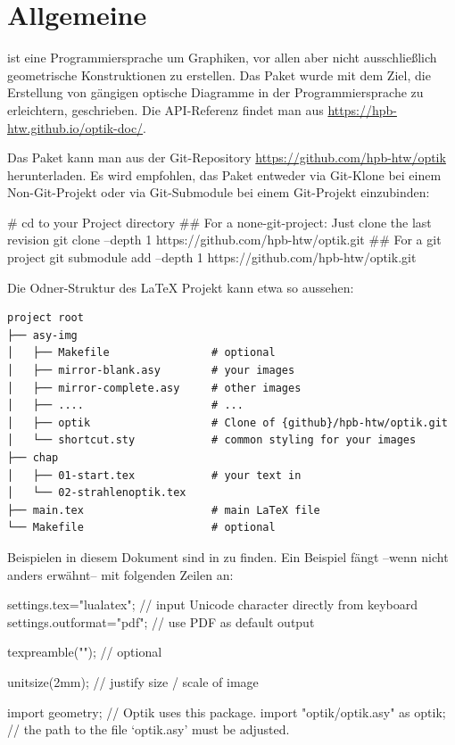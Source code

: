 \chapter{Allgemeine}

\asypmtote\cite{Asymptote} ist eine Programmiersprache um Graphiken, vor allen aber nicht ausschließlich geometrische Konstruktionen zu erstellen.
Das Paket \optik{} wurde mit dem Ziel, die Erstellung von gängigen optische Diagramme in der Programmiersprache \asypmtote{} zu erleichtern, geschrieben.
Die API-Referenz findet man aus \url{https://hpb-htw.github.io/optik-doc/}.

Das Paket kann man aus der Git-Repository \url{https://github.com/hpb-htw/optik} herunterladen.
Es wird empfohlen, das Paket entweder via Git-Klone bei einem Non-Git-Projekt oder via Git-Submodule bei einem Git-Projekt einzubinden:

\begin{shellcode}
#  cd to your Project directory
## For a none-git-project: Just clone the last revision
git clone --depth 1 https://github.com/hpb-htw/optik.git
## For a git project
git submodule add --depth 1 https://github.com/hpb-htw/optik.git
\end{shellcode}

Die Odner-Struktur des \LaTeX{} Projekt kann etwa so aussehen:

\begin{verbatim}
project root
├── asy-img
│   ├── Makefile                # optional
│   ├── mirror-blank.asy        # your images
│   ├── mirror-complete.asy     # other images
│   ├── ....                    # ...
│   ├── optik                   # Clone of {github}/hpb-htw/optik.git
│   └── shortcut.sty            # common styling for your images
├── chap
│   ├── 01-start.tex            # your text in
│   └── 02-strahlenoptik.tex
├── main.tex                    # main LaTeX file
└── Makefile                    # optional
\end{verbatim}

Beispielen in diesem Dokument sind in \repo{} zu finden. 
Ein Beispiel fängt --wenn nicht anders erwähnt-- mit folgenden Zeilen an:

\begin{asycode}
settings.tex="lualatex";  // input Unicode character directly from keyboard
settings.outformat="pdf"; // use PDF as default output

texpreamble(""); // optional

unitsize(2mm);                       // justify size / scale of image

import geometry;                     // Optik uses this package.
import "optik/optik.asy" as optik;   // the path to the file `optik.asy' must be adjusted.
\end{asycode}


